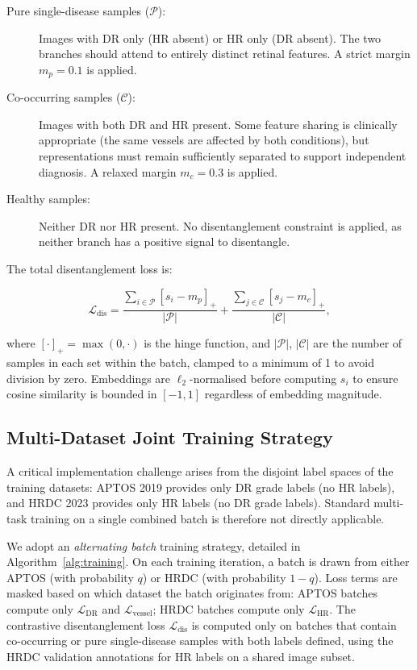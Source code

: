 \documentclass[review,12pt]{elsarticle}
\begin{document}
\begin{description}
  \item[Pure single-disease samples ($\mathcal{P}$):] Images with DR only
  (HR absent) or HR only (DR absent). The two branches should attend to
  entirely distinct retinal features. A strict margin $m_p = 0.1$ is applied.

  \item[Co-occurring samples ($\mathcal{C}$):] Images with both DR and HR
  present. Some feature sharing is clinically appropriate (the same vessels
  are affected by both conditions), but representations must remain
  sufficiently separated to support independent diagnosis. A relaxed margin
  $m_c = 0.3$ is applied.

  \item[Healthy samples:] Neither DR nor HR present. No disentanglement
  constraint is applied, as neither branch has a positive signal to
  disentangle.
\end{description}

The total disentanglement loss is:

\begin{equation}
  \mathcal{L}_{\text{dis}} =
  \frac{\sum_{i \in \mathcal{P}} [s_i - m_p]_+}{|\mathcal{P}|}
  + \frac{\sum_{j \in \mathcal{C}} [s_j - m_c]_+}{|\mathcal{C}|},
  \label{eq:dis_loss}
\end{equation}

where $[\cdot]_+ = \max(0, \cdot)$ is the hinge function, and $|\mathcal{P}|$,
$|\mathcal{C}|$ are the number of samples in each set within the batch,
clamped to a minimum of 1 to avoid division by zero. Embeddings are
$\ell_2$-normalised before computing $s_i$ to ensure cosine similarity
is bounded in $[-1, 1]$ regardless of embedding magnitude.

\subsection{Multi-Dataset Joint Training Strategy}

A critical implementation challenge arises from the disjoint label spaces of
the training datasets: APTOS 2019 provides only DR grade labels (no HR labels),
and HRDC 2023 provides only HR labels (no DR grade labels). Standard multi-task
training on a single combined batch is therefore not directly applicable.

We adopt an \textit{alternating batch} training strategy, detailed in
Algorithm~\ref{alg:training}. On each training iteration, a batch is drawn
from either APTOS (with probability $q$) or HRDC (with probability $1-q$).
Loss terms are masked based on which dataset the batch originates from:
APTOS batches compute only $\mathcal{L}_{\text{DR}}$ and
$\mathcal{L}_{\text{vessel}}$; HRDC batches compute only $\mathcal{L}_{\text{HR}}$.
The contrastive disentanglement loss $\mathcal{L}_{\text{dis}}$ is computed
only on batches that contain co-occurring or pure single-disease samples with
both labels defined, using the HRDC validation annotations for HR labels on
a shared image subset.
\end{document}
